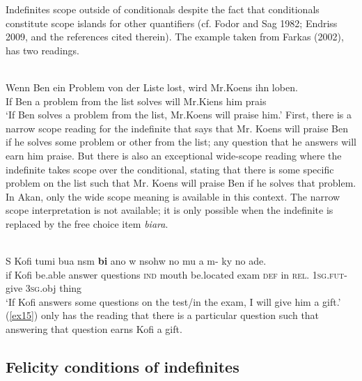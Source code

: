 \documentclass[output=paper,
modfonts
]{langsci/langscibook}
\begin{document}
  Indefinites scope outside of conditionals despite the fact that conditionals constitute scope islands for other quantifiers (cf. Fodor and Sag 1982; Endriss 2009, and the references cited therein). The example taken from Farkas (2002), has two readings.

\ea\label{ex14}\\
\gll Wenn Ben ein Problem von der Liste lost, wird Mr.Koens ihn loben. \\
    If Ben a problem from the list solves will Mr.Kiens him prais\\
\glt `If Ben solves a problem from the list, Mr.Koens will praise him.'
\z
First, there is a narrow scope reading for the indefinite that says that  Mr. Koens will praise Ben if he solves some problem or other from the list; any question that he answers will earn him praise. But there is also an exceptional wide-scope reading where the indefinite takes scope over the conditional, stating that there is some specific problem on the list such that Mr. Koens will praise Ben if he solves that problem. 
\\In Akan, only the wide scope meaning is available in this context. The narrow scope interpretation is not available; it is only possible when the indefinite is replaced by the free choice item \emph{biara}.



\ea\label{ex15} \\
\gll  S Kofi tumi bua nsm \textbf{bi} ano w nsohw no mu a m- ky no ade.\\
 if Kofi be.able answer questions \textsc{ind} mouth be.located exam \textsc{def} in \textsc{rel.} \textsc{1sg.fut}- give \textsc{3sg}.obj thing \\
\glt `If Kofi answers some questions on the test/in the exam, I will give him a gift.'
\z (\ref{ex15}) only has the reading that there is a particular question such that answering that question earns Kofi a gift. 




\subsection{Felicity conditions of indefinites}
\end{document}
